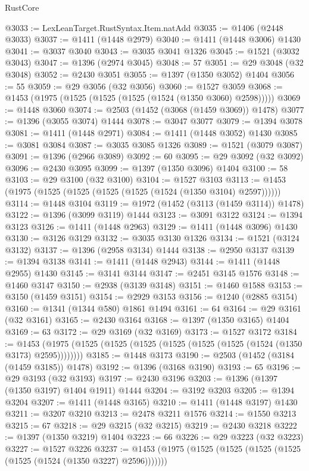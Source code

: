 \begin{lexlean}{RustCore}
\begin{coremodule}
@3033 := LexLeanTarget.RustSyntax.Item.natAdd
@3035 := @1406 (@2448 @3033)
@3037 := @1411 (@1448 @2979)
@3040 := @1411 (@1448 @3006) @1430
@3041 := @3037 @3040
@3043 := @3035 @3041 @1326
@3045 := @1521 (@3032 @3043)
@3047 := @1396 (@2974 @3045)
@3048 := 57
@3051 := @29 @3048 (@32 @3048)
@3052 := @2430 @3051
@3055 := @1397 (@1350 @3052) @1404
@3056 := 55
@3059 := @29 @3056 (@32 @3056)
@3060 := @1527 @3059
@3068 := @1453 (@1975 (@1525 (@1525 (@1525 (@1524 (@1350 @3060) @2598)))))
@3069 := @1448 @3060
@3074 := @2503 (@1452 (@3068 (@1459 @3069)) @1478)
@3077 := @1396 (@3055 @3074) @1444
@3078 := @3047 @3077
@3079 := @1394 @3078
@3081 := @1411 (@1448 @2971)
@3084 := @1411 (@1448 @3052) @1430
@3085 := @3081 @3084
@3087 := @3035 @3085 @1326
@3089 := @1521 (@3079 @3087)
@3091 := @1396 (@2966 @3089)
@3092 := 60
@3095 := @29 @3092 (@32 @3092)
@3096 := @2430 @3095
@3099 := @1397 (@1350 @3096) @1404
@3100 := 58
@3103 := @29 @3100 (@32 @3100)
@3104 := @1527 @3103
@3113 := @1453 (@1975 (@1525 (@1525 (@1525 (@1525 (@1524 (@1350 @3104) @2597))))))
@3114 := @1448 @3104
@3119 := @1972 (@1452 (@3113 (@1459 @3114)) @1478)
@3122 := @1396 (@3099 @3119) @1444
@3123 := @3091 @3122
@3124 := @1394 @3123
@3126 := @1411 (@1448 @2963)
@3129 := @1411 (@1448 @3096) @1430
@3130 := @3126 @3129
@3132 := @3035 @3130 @1326
@3134 := @1521 (@3124 @3132)
@3137 := @1396 (@2958 @3134) @1444
@3138 := @2950 @3137
@3139 := @1394 @3138
@3141 := @1411 (@1448 @2943)
@3144 := @1411 (@1448 @2955) @1430
@3145 := @3141 @3144
@3147 := @2451 @3145 @1576
@3148 := @1460 @3147
@3150 := @2938 (@3139 @3148)
@3151 := @1460 @1588
@3153 := @3150 (@1459 @3151)
@3154 := @2929 @3153
@3156 := @1240 (@2885 @3154)
@3160 := @1341 (@1344 @580) @1861 @1494
@3161 := 64
@3164 := @29 @3161 (@32 @3161)
@3165 := @2430 @3164
@3168 := @1397 (@1350 @3165) @1404
@3169 := 63
@3172 := @29 @3169 (@32 @3169)
@3173 := @1527 @3172
@3184 := @1453 (@1975 (@1525 (@1525 (@1525 (@1525 (@1525 (@1525 (@1524 (@1350 @3173) @2595))))))))
@3185 := @1448 @3173
@3190 := @2503 (@1452 (@3184 (@1459 @3185)) @1478)
@3192 := @1396 (@3168 @3190)
@3193 := 65
@3196 := @29 @3193 (@32 @3193)
@3197 := @2430 @3196
@3203 := @1396 (@1397 (@1350 @3197) @1404 @1911) @1444
@3204 := @3192 @3203
@3205 := @1394 @3204
@3207 := @1411 (@1448 @3165)
@3210 := @1411 (@1448 @3197) @1430
@3211 := @3207 @3210
@3213 := @2478 @3211 @1576
@3214 := @1550 @3213
@3215 := 67
@3218 := @29 @3215 (@32 @3215)
@3219 := @2430 @3218
@3222 := @1397 (@1350 @3219) @1404
@3223 := 66
@3226 := @29 @3223 (@32 @3223)
@3227 := @1527 @3226
@3237 := @1453 (@1975 (@1525 (@1525 (@1525 (@1525 (@1525 (@1524 (@1350 @3227) @2596)))))))

\end{coremodule}
\end{lexlean}
